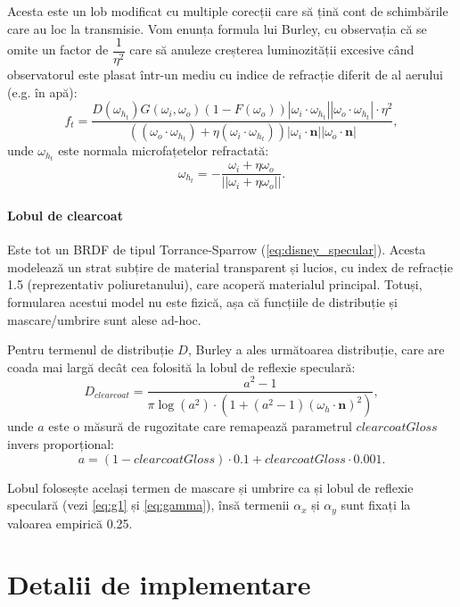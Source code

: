 \documentclass[12pt,a4paper]{report}
\numberwithin{equation}{section} %
\begin{document}
Acesta este un lob modificat cu multiple corecții care să țină cont de schimbările
care au loc la transmisie. Vom enunța formula lui Burley, cu observația că se omite
un factor de $\dfrac{1}{\eta^2}$ care să anuleze creșterea luminozității excesive
când observatorul este plasat într-un mediu cu indice de refracție diferit de al aerului
(e.g. în apă):
\begin{equation}\label{eq:disney_transmission}
	f_{t} = \dfrac{D(\omega_{h_t})G(\omega_i, \omega_o)(1 - F(\omega_o))|\omega_i\cdot\omega_{h_t}||\omega_o\cdot\omega_{h_t}|\cdot\eta^2}{((\omega_o\cdot\omega_{h_t}) + \eta(\omega_i\cdot\omega_{h_t}))|\omega_i\cdot\mathbf{n}||\omega_o\cdot\mathbf{n}|},
\end{equation}
unde $\omega_{h_t}$ este normala microfațetelor refractată:
\begin{equation}
	\omega_{h_t} = -\dfrac{\omega_i + \eta\omega_o}{||\omega_i + \eta\omega_o||}.
\end{equation}

\subsubsection*{Lobul de clearcoat}

Este tot un BRDF de tipul Torrance-Sparrow (\ref{eq:disney_specular}). Acesta
modelează un strat subțire de material transparent și lucios, cu index de refracție 1.5
(reprezentativ poliuretanului), care acoperă materialul principal. Totuși, formularea
acestui model nu este fizică, așa că funcțiile de distribuție și mascare/umbrire sunt
alese ad-hoc.

Pentru termenul de distribuție $D$, Burley a ales următoarea distribuție, care
are coada mai largă decât cea folosită la lobul de reflexie speculară:
\begin{equation}
	D_{clearcoat} = \dfrac{a^2 - 1}{\pi\log(a^2)\cdot (1 + (a^2 - 1)(\omega_h\cdot\mathbf{n})^2)},
\end{equation}
unde $a$ este o măsură de rugozitate care remapează parametrul $clearcoatGloss$ invers proporțional:
\begin{equation}
	a = (1 - clearcoatGloss)\cdot 0.1 + clearcoatGloss\cdot 0.001.
\end{equation}

Lobul folosește același termen de mascare
și umbrire ca și lobul de reflexie speculară (vezi \ref{eq:g1} și \ref{eq:gamma}),
însă termenii $\alpha_x$ și $\alpha_y$ sunt fixați la valoarea empirică 0.25.


\chapter{\label{sec:implementare}Detalii de implementare}
\end{document}
